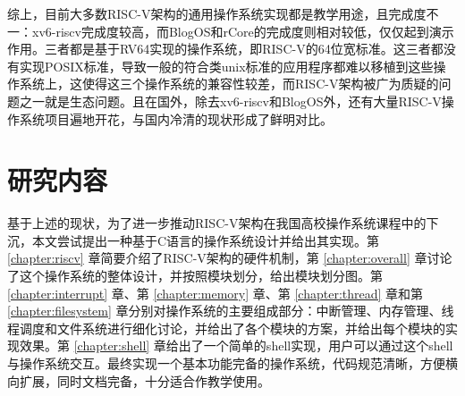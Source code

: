 综上，目前大多数RISC-V架构的通用操作系统实现都是教学用途，且完成度不一：xv6-riscv完成度较高，而BlogOS和rCore的完成度则相对较低，仅仅起到演示作用。三者都是基于RV64实现的操作系统，即RISC-V的64位宽标准。这三者都没有实现POSIX标准\cite{DBLP:journals/computer/Isaak90a}，导致一般的符合类unix标准的应用程序都难以移植到这些操作系统上，这使得这三个操作系统的兼容性较差，而RISC-V架构被广为质疑的问题之一就是生态问题。且在国外，除去xv6-riscv和BlogOS外，还有大量RISC-V操作系统项目遍地开花，与国内冷清的现状形成了鲜明对比。

\section{研究内容}

基于上述的现状，为了进一步推动RISC-V架构在我国高校操作系统课程中的下沉，本文尝试提出一种基于C语言的操作系统设计并给出其实现。第 \ref{chapter:riscv} 章简要介绍了RISC-V架构的硬件机制，第 \ref{chapter:overall} 章讨论了这个操作系统的整体设计，并按照模块划分，给出模块划分图。第 \ref{chapter:interrupt} 章、第 \ref{chapter:memory} 章、第 \ref{chapter:thread} 章和第 \ref{chapter:filesystem} 章分别对操作系统的主要组成部分：中断管理、内存管理、线程调度和文件系统进行细化讨论，并给出了各个模块的方案，并给出每个模块的实现效果。第 \ref{chapter:shell} 章给出了一个简单的shell实现，用户可以通过这个shell与操作系统交互。最终实现一个基本功能完备的操作系统，代码规范清晰，方便横向扩展，同时文档完备，十分适合作教学使用。